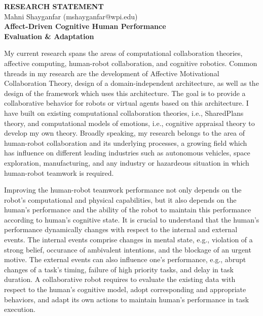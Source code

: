 \documentclass[a4paper, 11pt]{article}
\begin{document}
\thispagestyle{fancy}

\lhead{}
\rhead{}

\renewcommand{\headrulewidth}{0pt} 
\renewcommand{\footrulewidth}{0pt} 

\pagestyle{fancy}

\rhead{\textcolor{gray}{\thepage/\totalpages{}}}

\begin{small}

\begin{center}
{\LARGE \bf RESEARCH STATEMENT}\\
\vspace*{0.1cm}
{\normalsize Mahni Shayganfar (mshayganfar@wpi.edu)}
\vspace{6mm}\\
{\Large \bf Affect-Driven Cognitive Human Performance \\Evaluation \&
Adaptation}\\
\end{center}

My current research spans the areas of computational collaboration theories,
affective computing, human-robot collaboration, and cognitive robotics. Common
threads in my research are the development of Affective Motivational
Collaboration Theory, design of a domain-independent architecture, as well as
the design of the framework which uses this architecture. The goal is to provide
a collaborative behavior for robots or virtual agents based on this
architecture. I have built on existing computational collaboration theories,
i.e., SharedPlans theory, and computational models of emotions, i.e., cognitive
appraisal theory to develop my own theory. Broadly speaking, my research belongs
to the area of human-robot collaboration and its underlying processes, a growing
field which has influence on different leading industries such as autonomous
vehicles, space exploration, manufacturing, and any industry or hazardeous
situation in which human-robot teamwork is required.

Improving the human-robot teamwork performance not only depends on the robot's
computational and physical capabilities, but it also depends on the human's
performance and the ability of the robot to maintain this performance according
to human's cognitive state. It is crucial to understand that the human's
performance dynamically changes with respect to the internal and external
events. The internal events comprise changes in mental state, e.g., violation of
a strong belief, occurance of ambivalent intentions, and the blockage of an
urgent motive. The external events can also influence one's performance, e.g.,
abrupt changes of a task's timing, failure of high priority tasks, and delay in
task duration. A collaborative robot requires to evaluate the existing data with
respect to the human's cognitive model, adopt corresponding and appropriate
behaviors, and adapt its own actions to maintain human's performance in task
execution.


\end{small}
\end{document}
